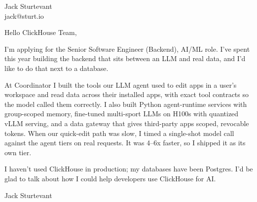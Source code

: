 \documentclass[11pt]{article}
\begin{document}
\raggedright

{\namefont\fontsize{20pt}{24pt}\selectfont Jack Sturtevant}\\[-0.3em]
jack@sturt.io

\vspace{1.2em}

Hello ClickHouse Team,

I'm applying for the Senior Software Engineer (Backend), AI/ML role. I've spent this year building the backend that sits between an LLM and real data, and I'd like to do that next to a database.

At Coordinator I built the tools our LLM agent used to edit apps in a user's workspace and read data across their installed apps, with exact tool contracts so the model called them correctly. I also built Python agent-runtime services with group-scoped memory, fine-tuned multi-sport LLMs on H100s with quantized vLLM serving, and a data gateway that gives third-party apps scoped, revocable tokens. When our quick-edit path was slow, I timed a single-shot model call against the agent tiers on real requests. It was 4--6x faster, so I shipped it as its own tier.

I haven't used ClickHouse in production; my databases have been Postgres. I'd be glad to talk about how I could help developers use ClickHouse for AI.

\vspace{0.6em}
Jack Sturtevant
\end{document}
